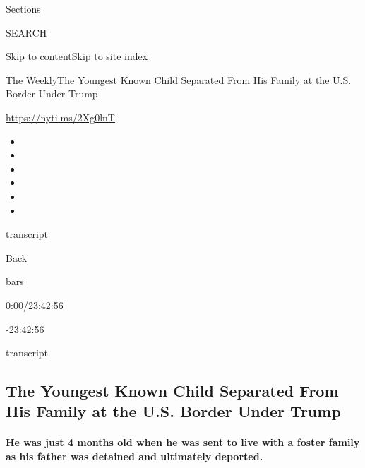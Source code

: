 Sections

SEARCH

\protect\hyperlink{site-content}{Skip to
content}\protect\hyperlink{site-index}{Skip to site index}

\href{/section/the-weekly}{The Weekly}\textbar{}The Youngest Known Child
Separated From His Family at the U.S. Border Under Trump

\url{https://nyti.ms/2Xg0lnT}

\begin{itemize}
\item
\item
\item
\item
\item
\item
\end{itemize}

transcript

Back

bars

0:00/23:42:56

-23:42:56

transcript

\hypertarget{the-youngest-known-child-separated-from-his-family-at-the-us-border-under-trump}{%
\subsection{The Youngest Known Child Separated From His Family at the
U.S. Border Under
Trump}\label{the-youngest-known-child-separated-from-his-family-at-the-us-border-under-trump}}

\hypertarget{he-was-just-4-months-old-when-he-was-sent-to-live-with-a-foster-family-as-his-father-was-detained-and-ultimately-deported}{%
\paragraph{He was just 4 months old when he was sent to live with a
foster family as his father was detained and ultimately
deported.}\label{he-was-just-4-months-old-when-he-was-sent-to-live-with-a-foster-family-as-his-father-was-detained-and-ultimately-deported}}


